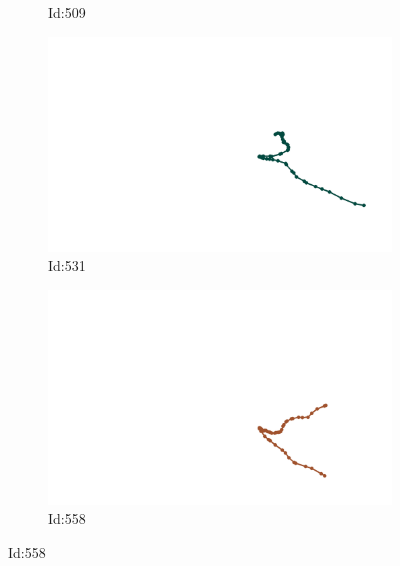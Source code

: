\documentclass[12pt,twoside]{report}
\begin{document}
\begin{figure}
\begin{subfigure}[b]{0.20\textwidth}
\caption{Id:509}
\end{subfigure}
\begin{subfigure}[b]{0.20\textwidth}
\centering
\includegraphics[width=\textwidth]{../trajectories/531.png}
\caption{Id:531}
\end{subfigure}
\begin{subfigure}[b]{0.20\textwidth}
\centering
\includegraphics[width=\textwidth]{../trajectories/558.png}
\caption{Id:558}
\end{subfigure}
\end{figure}
\end{document}
